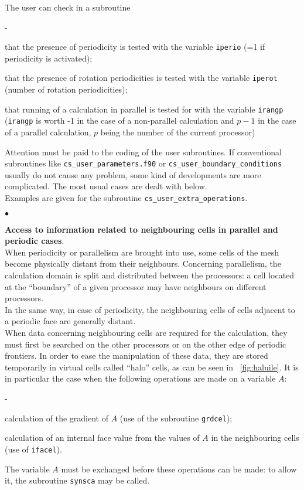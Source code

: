{{{{The user can check in a subroutine
\begin{list}{-}{}
\item that the presence of periodicity is tested with the variable
      \texttt{iperio} (=1 if periodicity is activated);
\item that the presence of rotation periodicities is tested with the variable
      \texttt{iperot} (number of rotation periodicities);
\item that running of a calculation in parallel is tested for with the
      variable \texttt{irangp} (\texttt{irangp} is worth -1 in the case of a
      non-parallel calculation and $p-1$ in the case of a parallel calculation,
      $p$ being the number of the current processor)
\end{list}
Attention must be paid to the coding of the user subroutines. If
conventional subroutines like \texttt{cs\_user\_parameters.f90} or \texttt{cs\_user\_boundary\_conditions}
usually do not cause any problem, some kind of developments are more
complicated. The most usual cases are dealt with below. \\ Examples are
given for the subroutine \texttt{cs\_user\_extra\_operations}.
\begin{list}{$\bullet$}{}
\item {\bf Access to information related to neighbouring cells in
      parallel and periodic cases}.\\
When periodicity or parallelism are brought into use, some cells of the
      mesh become physically distant from their neighbours. Concerning
      parallelism, the calculation domain is split and distributed
      between the processors: a cell located at the ``boundary'' of a
      given processor may have neighbours on different processors. \\
In the same way, in case of periodicity, the neighbouring cells of cells
      adjacent to a periodic face are generally distant. \\
When data concerning neighbouring cells are required for the
      calculation, they must first be searched on the other processors
      or on the other edge of periodic frontiers. In order to ease the
      manipulation of these data, they are stored temporarily in virtual
      cells called ``halo'' cells, as can be seen in \figurename~\ref{fig:haluile}.
It is in particular the case when the following operations are made on a
      variable $A$:
\begin{list}{-}{}
\item calculation of the gradient of $A$ (use of the subroutine \texttt{grdcel});
\item calculation of an internal face value from the values of $A$  in
      the neighbouring cells (use of \texttt{ifacel}).
\end{list}
The variable $A$ must be exchanged before these operations can be
      made: to allow it, the subroutine \texttt{synsca} may be called.


\end{list}}}}}
